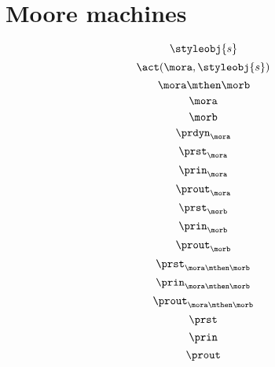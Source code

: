 
\section{Moore machines}

\begin{forslides}
  \begin{equation}\label{eq:signal}
  \styleobj{s}
  \end{equation}
  \begin{equation}\label{eq:signal-apply}
    \act(\mora, \styleobj{s})
    \end{equation}
    \begin{equation}\label{eq:morab}
      \mora \mthen \morb
      \end{equation}
      \begin{equation}\label{eq:mora}
        \mora  
        \end{equation}
        \begin{equation}\label{eq:morb}
          \morb
          \end{equation}
          \begin{equation}\label{eq:mora-prdyn}
            \prdyn_{\mora}
            \end{equation}
\begin{equation}\label{eq:mora-prst}
\prst_{\mora}
\end{equation}
\begin{equation}\label{eq:mora-prin}
\prin_{\mora}
\end{equation}
\begin{equation}\label{eq:mora-prout}
\prout_{\mora}
\end{equation}
\begin{equation}\label{eq:morb-prst}
  \prst_{\morb}
  \end{equation}
  \begin{equation}\label{eq:morb-prin}
  \prin_{\morb}
  \end{equation}
  \begin{equation}\label{eq:morb-prout}
  \prout_{\morb}
  \end{equation}
  \begin{equation}\label{eq:morab-prst}
    \prst_{\mora\mthen\morb}
    \end{equation}
    \begin{equation}\label{eq:morab-prin}
    \prin_{\mora\mthen\morb}
    \end{equation}
    \begin{equation}\label{eq:morab-prout}
    \prout_{\mora\mthen\morb}
    \end{equation}
  \begin{equation}\label{eq:gen-prst}
    \prst
    \end{equation}
    \begin{equation}\label{eq:gen-prin}
    \prin
    \end{equation}
    \begin{equation}\label{eq:gen-prout}
    \prout
    \end{equation}
\end{forslides}


